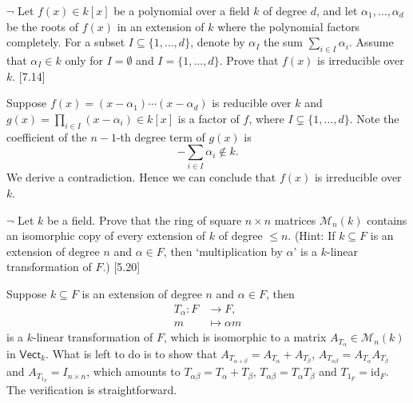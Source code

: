 \begin{problem}[1.8]
	$\neg$ Let $f(x) \in k[x]$ be a polynomial over a field $k$ of degree $d$, and let $\alpha_{1}, \ldots, \alpha_{d}$ be the roots of $f(x)$ in an extension of $k$ where the polynomial factors completely. For a subset $I \subseteq\{1, \ldots, d\}$, denote by $\alpha_{I}$ the sum $\sum_{i \in I} \alpha_{i}$. Assume that $\alpha_{I} \in k$ only for $I=\emptyset$ and $I=\{1, \ldots, d\}$. Prove that $f(x)$ is irreducible over $k$. [7.14]
\end{problem}
\begin{solution}
	Suppose $f(x)=(x-\alpha_1)\cdots(x-\alpha_d)$ is reducible over $k$ and $g(x)=\prod_{i\in I} (x-\alpha_{i})\in k[x]$ is a factor of $f$, where $I\subsetneq \{1, \ldots, d\}$. Note the coefficient of the $n-1$-th degree term of $g(x)$ is 
	\[
		-\sum_{i \in I} \alpha_{i}\notin k.
	\]
	We derive a contradiction. Hence we can conclude that $f(x)$ is irreducible over $k$.
\end{solution}

\begin{problem}[1.10]
	$\neg$ Let $k$ be a field. Prove that the ring of square $n \times n$ matrices $\mathcal{M}_{n}(k)$ contains an isomorphic copy of every extension of $k$ of degree $\leq n$. (Hint: If $k \subseteq F$ is an extension of degree $n$ and $\alpha \in F$, then `multiplication by $\alpha$' is a $k$-linear transformation of $F$.) [5.20]
\end{problem}
\begin{solution}
	Suppose $k\subseteq F$ is an extension of degree $n$ and $\alpha \in F$, then 
	\begin{align*}
		T_\alpha:F&\longrightarrow F,\\
		 m&\longmapsto\alpha m
	\end{align*} 
	is a $k$-linear transformation of $F$, which is isomorphic to a matrix $A_{T_\alpha}\in \mathcal{M}_{n}(k)$ in $\mathsf{Vect}_k$. What is left to do is to show that $A_{T_{\alpha+\beta}}=A_{T_{\alpha}}+A_{T_{\beta}}$, $A_{T_{\alpha\beta}}=A_{T_{\alpha}}A_{T_{\beta}}$ and $A_{T_{1_F}}=I_{n\times n}$, which amounts to $T_{\alpha\beta}=T_{\alpha}+T_{\beta}$, $T_{\alpha\beta}=T_{\alpha}T_{\beta}$ and $T_{1_F}=\mathrm{id}_F$. The verification is straightforward.
\end{solution}

